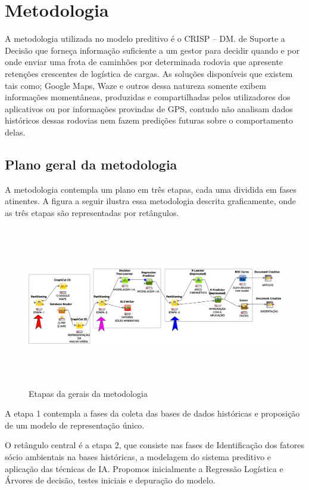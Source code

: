 \chapter{ Metodologia}\label{meto}

A metodologia utilizada no modelo preditivo é o CRISP -- DM. de Suporte a Decisão que forneça informação suficiente a um gestor para decidir quando e por onde 
enviar uma frota de caminhões por determinada rodovia que apresente retenções crescentes de logística de cargas. As soluções disponíveis que 
existem tais como; Google Maps, Waze e outros dessa natureza somente exibem informações momentâneas, produzidas e compartilhadas pelos utilizadores 
dos aplicativos ou por informações provindas de GPS, contudo não analisam dados históricos dessas rodovias nem fazem predições futuras sobre o 
comportamento delas. \\

\section{ Plano geral da metodologia}

A metodologia contempla um plano em três etapas, cada uma dividida em fases atinentes. 
A figura a seguir ilustra essa metodologia descrita graficamente, onde as três etapas são representadas por retângulos.
 
\begin{figure}[ht]
\centering
\caption{Etapas da gerais da metodologia}
\includegraphics[width=160mm, height=70mm]{Figuras/BigData/Etapas.png}
\end{figure}

 A etapa 1 contempla a fases da coleta das bases de dados históricas e proposição de um modelo de representação único.
 
 O retângulo central é a etapa 2, que consiste nas fases de Identificação dos fatores sócio ambientais na bases históricas, a modelagem do sistema preditivo e aplicação das técnicas de IA. Propomos inicialmente a Regressão Logística e Árvores de decisão, testes iniciais e depuração do modelo.
 
